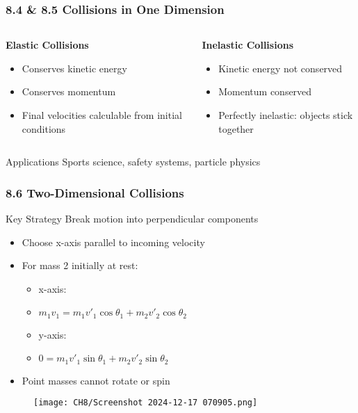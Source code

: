 \documentclass[aspectratio=169]{beamer}
\begin{document}
\begin{frame}
\frametitle{8.4 & 8.5 Collisions in One Dimension}
\begin{columns}[t]
\begin{column}{0.48\textwidth}
\textbf{Elastic Collisions}
\begin{itemize}
\item Conserves kinetic energy
\item Conserves momentum
\item Final velocities calculable from initial conditions
\end{itemize}
\end{column}

\begin{column}{0.48\textwidth}
\textbf{Inelastic Collisions}
\begin{itemize}
\item Kinetic energy not conserved
\item Momentum conserved
\item Perfectly inelastic: objects stick together
\end{itemize}
\end{column}
\end{columns}

\begin{block}{Applications}
Sports science, safety systems, particle physics
\end{block}
\end{frame}

\begin{frame}
\frametitle{8.6 Two-Dimensional Collisions}

\begin{block}{Key Strategy}
Break motion into perpendicular components
\end{block}

\begin{itemize}
\item Choose x-axis parallel to incoming velocity
\item For mass 2 initially at rest:
    \begin{itemize}
    \item x-axis:
    \item $m_1v_1 = m_1v'_1\cos\theta_1 + m_2v'_2\cos\theta_2$
    \item y-axis:
    \item $0 = m_1v'_1\sin\theta_1 + m_2v'_2\sin\theta_2$
    \end{itemize}
\item Point masses cannot rotate or spin
\end{itemize}
\end{frame}
\begin{frame}{}
    \begin{figure}
        \centering
        \texttt{[image: CH8/Screenshot 2024-12-17 070905.png]}
       
    \end{figure}
\end{frame}
\end{document}
